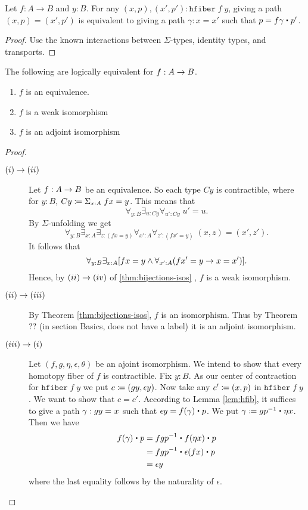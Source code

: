 \begin{lem}\label{lem:hfib}
Let $f : A \to B$ and $y : B$. For any $(x,p), (x',p') : \mathtt{hfiber} \; f \;y$, giving a path $(x,p) = (x',p')$ is equivalent to giving a path $\gamma : x = x'$ such that $p = f\gamma \ct p' $. 
\end{lem}
\begin{proof}
Use the known interactions between $\Sigma$-types, identity types, and transports.
\end{proof}

\begin{thm}\label{thm:equiv-iso-adj} The following are logically equivalent for $f:A\rightarrow B$.
\begin{enumerate}
\item $f$ is an equivalence.
\item $f$ is a weak isomorphism
\item $f$ is an adjoint isomorphism
\end{enumerate}
\end{thm}
\begin{proof} $\;$

\begin{description}
\item[$(i)\rightarrow (ii)$] 
Let $f:A\rightarrow B$ be an equivalence.  So each type $Cy$ is contractible, where for $y:B$, $Cy \coloneqq \Sigma_{x:A}\; fx=y$.  This means that
  \[ \forall_{y:B}\exists_{u:Cy}\forall_{u':Cy}\; u'=u.\]
By $\Sigma$-unfolding we get
  \[ \forall_{y:B}\exists_{x:A}\exists_{z:(fx=y)}
                            \forall_{x':A}\forall_{z':(fx'=y)}\; (x,z)=(x',z').
  \]
It follows that
  \[ \forall_{y:B}\exists_{x:A}[fx=y\wedge\forall_{x':A}(fx'=y\rightarrow  x=x')].
  \]
Hence, by $(ii)\rightarrow (iv)$ of \autoref{thm:bijections-isos} , $f$ is a weak isomorphism.
\item[$(ii)\rightarrow (iii)$] By Theorem \ref{thm:bijections-isos}, $f$ is an isomorphism. Thus by Theorem ?? (in section Basics, does not have a label) it is an adjoint isomorphism.

\item[$(iii)\rightarrow (i)$] Let $(f,g,\eta,\epsilon,\theta)$ be an ajoint isomorphism. We intend to show that every homotopy fiber of $f$ is contractible. Fix $y : B$.
As our center of contraction for $\mathtt{hfiber} \; f \;y$ we put $c \coloneqq (gy, \epsilon y)$. Now take any $c' \coloneqq (x, p)$ in $\mathtt{hfiber} \; f \;y$. We want to show that $c = c'$. According to Lemma \ref{lem:hfib}, it suffices to give a path $\gamma : gy =_{} x$ such that $\epsilon y = f(\gamma) \ct p$. We put $\gamma \defeq {\opp{gp}} \ct {\eta x}$. Then we have 
\begin{align*}
f(\gamma) \ct p & = \opp{fgp} \ct {f (\eta x)} \ct p \\
& = \opp{fgp} \ct {\epsilon(f x)} \ct p \\
& = \epsilon y
\end{align*}
where the last equality follows by the naturality of $\epsilon$.

\end{description}
\end{proof}
